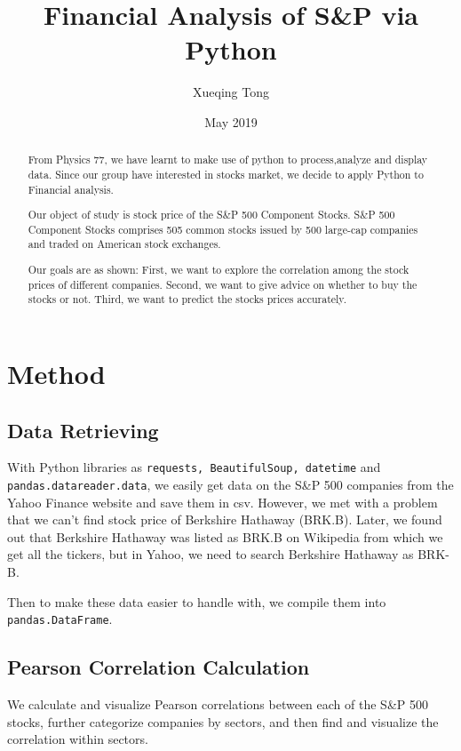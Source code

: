 \documentclass{article}
\title{\bf{Financial Analysis of S\&P via Python}}
\author{Xueqing Tong}
\date{May 2019}
\begin{document}
    \begin{titlepage}
        \maketitle
        \setcounter{page}{0}
        \thispagestyle{empty}
    \end{titlepage}

    \renewcommand{\abstractname}{Introduction}
    \begin{abstract}
        From Physics 77, we have learnt to make use of python to process,analyze and display data. Since our group have interested in stocks market, we decide to apply Python to Financial analysis.

        Our object of study is stock price of the S\&P 500 Component Stocks. S\&P 500 Component Stocks comprises 505 common stocks issued by 500 large-cap companies and traded on American stock exchanges. 

        Our goals are as shown: First, we want to explore the correlation among the stock prices of different companies. Second, we want to give advice on whether to buy the stocks or not. Third, we want to predict the stocks prices accurately.
    \end{abstract}



    \section{Method}
    
        \subsection{Data Retrieving}
        With Python libraries as \verb!requests, BeautifulSoup, datetime! and \verb!pandas.datareader.data!, we easily get data on the S\&P 500 companies from the Yahoo Finance website and save them in csv. However, we met with a problem that we can't find stock price of Berkshire Hathaway (BRK.B). Later, we found out that Berkshire Hathaway was listed as BRK.B on Wikipedia from which we get all the tickers, but in Yahoo, we need to search Berkshire Hathaway as BRK-B.

        Then to make these data easier to handle with, we compile them into \verb!pandas.DataFrame!.

        \subsection{Pearson Correlation Calculation}
        We calculate and visualize Pearson correlations between each of the S\&P 500 stocks, further categorize companies by sectors, and then find and visualize the correlation within sectors. 
        
\end{document}
